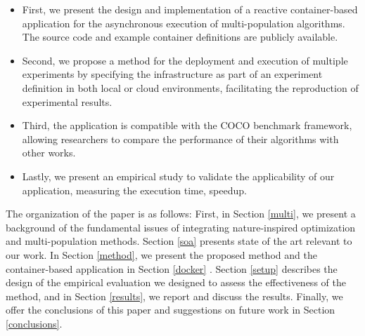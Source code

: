 \documentclass[review]{elsarticle}
\begin{document}
\begin{itemize}
    \item First, we present the design and implementation of a reactive 
    container-based application for the asynchronous execution of multi-population 
    algorithms. The source code and example container definitions are
    publicly available. %
    \item Second, we propose a method for the deployment and execution of 
    multiple experiments by specifying the infrastructure as part of an 
    experiment definition in both local or cloud environments,
    facilitating the reproduction of experimental results. %
    \item Third, the application is compatible with the COCO benchmark 
    framework, allowing researchers to compare the performance of their 
    algorithms with other works. %
    \item Lastly, we present an empirical study to validate the 
    applicability of our application,  measuring the execution time, 
    speedup.
\end{itemize}

The organization of the paper is as follows: First, in Section \ref{multi}, we present a
background of the fundamental issues of integrating nature-inspired optimization
and multi-population methods. Section \ref{soa} presents state of the art relevant to
our work. In Section \ref{method}, we present the proposed method and the container-based
application in Section \ref{docker} .  Section \ref{setup} describes
the design of the empirical evaluation we designed to assess the effectiveness
of the method, and in Section \ref{results}, we report and discuss the results. Finally, we
offer the conclusions of this paper and suggestions on future work in Section \ref{conclusions}.
\end{document}
